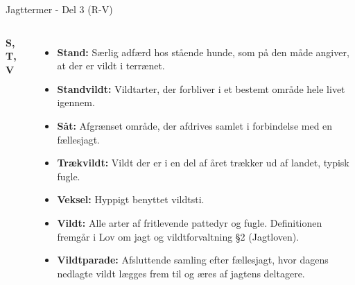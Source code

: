 \begin{frame}{Jagttermer - Del 3 (R-V)}
\begin{columns}[T]
    \textbf{\large S, T, V}
    \setlength{\parskip}{0.1em} %
    \scriptsize %
    \RaggedRight
    \begin{itemize}
        \item \textbf{Stand:} Særlig adfærd hos stående hunde, som på den måde angiver, at der er vildt i terrænet.
        \item \textbf{Standvildt:} Vildtarter, der forbliver i et bestemt område hele livet igennem.
        \item \textbf{Såt:} Afgrænset område, der afdrives samlet i forbindelse med en fællesjagt.
        \item \textbf{Trækvildt:} Vildt der er i en del af året trækker ud af landet, typisk fugle.
        \item \textbf{Veksel:} Hyppigt benyttet vildtsti.
        \item \textbf{Vildt:} Alle arter af fritlevende pattedyr og fugle. Definitionen fremgår i Lov om jagt og vildtforvaltning §2 (Jagtloven).
        \item \textbf{Vildtparade:} Afsluttende samling efter fællesjagt, hvor dagens nedlagte vildt lægges frem til og æres af jagtens deltagere.
    \end{itemize}
\end{columns}

\end{frame}